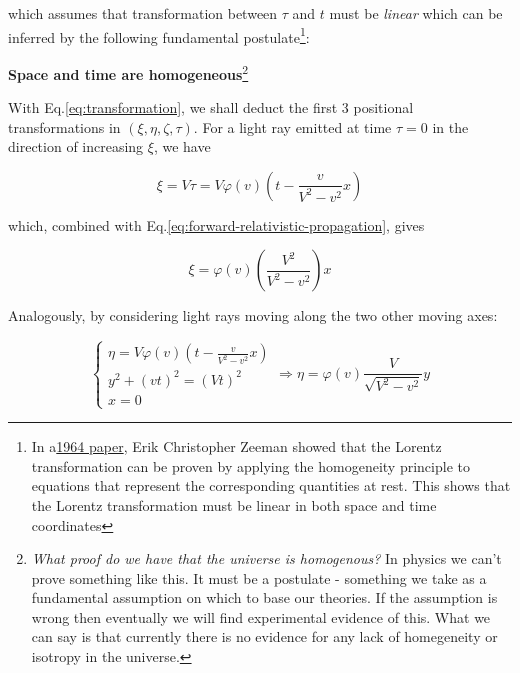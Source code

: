 which assumes that transformation between $\tau$ and $t$ must be \textit{linear} which can be inferred by the
following fundamental postulate\footnote{In a\href{https://download.wpsoftware.net/causality-lorentz-group-zeeman.pdf}{1964 paper}, Erik Christopher Zeeman showed that the Lorentz transformation can be proven by applying the homogeneity principle to equations that represent the corresponding quantities at rest. This shows that the Lorentz transformation must be linear in both space and time coordinates}:

\begin{tcolorbox}[
    enhanced,frame hidden,boxrule=0pt,interior style={top color=green!10!white,
    bottom color=green!10!white,middle color=green!50!yellow},
    fuzzy halo=1pt with green
]
    \begin{center}
        \textbf{Space and time are homogeneous}\footnote{\textit{What proof do we have that the universe is
        homogenous?} In physics we can't prove something like this. It must be a postulate - something we take as a
        fundamental assumption on which to base our theories. If the assumption is wrong then eventually we will find
        experimental evidence of this. What we can say is that currently there is no evidence for any lack of
        homegeneity or isotropy in the universe.}
    \end{center}
\end{tcolorbox}

With Eq.\ref{eq:transformation}, we shall deduct the first 3 positional transformations in $(\xi, \eta, \zeta, \tau)$.
For a light ray emitted at time $\tau = 0$ in the direction of increasing $\xi$, we have

\begin{equation}
    \xi = V\tau = V\varphi(v)\left( t - \frac{v}{V^2 - v^2} x \right)
\end{equation}

which, combined with Eq.\ref{eq:forward-relativistic-propagation}, gives

\begin{equation}\label{eq:x-transformation}
    \xi = \varphi(v)\left( \frac{V^2}{V^2 - v^2} \right) x
\end{equation}

Analogously, by considering light rays moving along the two other moving axes:

\begin{equation}\label{eq:y-transformation}
    \left\{
    \begin{array}{l}
        \eta = V\varphi(v)\left( t - \frac{v}{V^2 - v^2} x \right) \\
        y^2 + (vt)^2 = (Vt)^2 \\
        x = 0
    \end{array}
    \right.
    \Rightarrow
    \eta = \varphi(v)\frac{V}{\sqrt{V^2 - v^2}}y
\end{equation}

